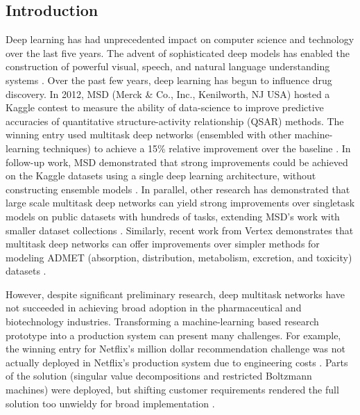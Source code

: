 \subsection{Introduction}
Deep learning has had unprecedented impact on computer science and technology over the last five years. The advent of sophisticated deep models has enabled the construction of powerful visual, speech, and natural language understanding systems \cite{lecun2015deep}. Over the past few years, deep learning has begun to influence drug discovery. In 2012, MSD (Merck \& Co., Inc., Kenilworth, NJ USA) hosted a Kaggle contest to measure the ability of data-science to improve predictive accuracies of quantitative structure-activity relationship (QSAR) methods. The winning entry used multitask deep networks (ensembled with other machine-learning techniques) to achieve a 15\% relative improvement over the baseline \cite{DahlKaggle}. In follow-up work, MSD demonstrated that strong improvements could be 
achieved on the Kaggle datasets using a single deep learning architecture, without constructing ensemble models \cite{ma2015deep}. In parallel, other research has demonstrated that large scale multitask deep networks can yield strong improvements over singletask models on public datasets with hundreds of tasks, extending MSD's work with smaller dataset collections \cite{ramsundar2015massively,unterthiner2014deep}. Similarly, recent work from Vertex demonstrates that multitask deep networks can offer improvements over simpler methods for modeling ADMET (absorption, distribution, metabolism, excretion, and toxicity) datasets \cite{kearnes2016modeling}. 

However, despite significant preliminary research, deep multitask networks have not succeeded in achieving broad adoption in the pharmaceutical and biotechnology industries. Transforming a machine-learning based research prototype into a production system can present
many challenges. For example, the winning entry for Netflix's million dollar recommendation challenge was not actually deployed in Netflix's production system due to engineering costs \cite{netflixNever}. Parts of the solution (singular value decompositions and restricted Boltzmann machines) were deployed, but shifting customer requirements rendered the full solution too unwieldy for broad implementation \cite{netflixBlog}.


